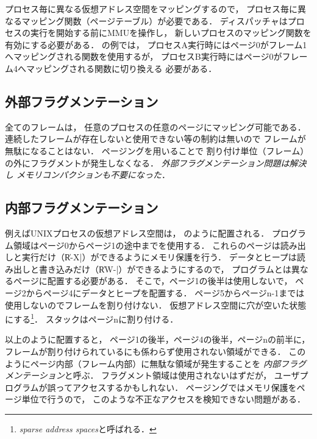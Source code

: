 プロセス毎に異なる仮想アドレス空間をマッピングするので，
プロセス毎に異なるマッピング関数（ページテーブル）が必要である．
ディスパッチャはプロセスの実行を開始する前にMMUを操作し，
新しいプロセスのマッピング関数を有効にする必要がある．
の例では，
プロセスA実行時にはページ0がフレーム1へマッピングされる関数を使用するが，
プロセスB実行時にはページ0がフレーム4へマッピングされる関数に切り換える
必要がある．

\subsection{外部フラグメンテーション}
全てのフレームは，
任意のプロセスの任意のページにマッピング可能である．
連続したフレームが存在しないと使用できない等の制約は無いので
フレームが無駄になることはない．
ページングを用いることで
割り付け単位（フレーム）の外にフラグメントが発生しなくなる．
\emph{外部フラグメンテーション問題は解決し
  メモリコンパクションも不要になった}．

\subsection{内部フラグメンテーション}
例えばUNIXプロセスの仮想アドレス空間は，
のように配置される．
プログラム領域はページ0からページ1の途中までを使用する．
これらのページは読み出しと実行だけ（\|R-X|）ができるようにメモリ保護を行う．
データとヒープは読み出しと書き込みだけ（\|RW-|）ができるようにするので，
プログラムとは異なるページに配置する必要がある．
そこで，ページ1の後半は使用しないで，
ページ2からページ4にデータとヒープを配置する．
ページ5からページn-1までは使用しないのでフレームを割り付けない．
仮想アドレス空間に穴が空いた状態にする\footnote{
  \emph{sparse address spaces}と呼ばれる．}．
スタックはページnに割り付ける．

以上のように配置すると，
ページ1の後半，ページ4の後半，ページnの前半に，
フレームが割り付けられているにも係わらず使用されない領域ができる．
このようにページ内部（フレーム内部）に無駄な領域が発生することを
\emph{内部フラグメンテーション}と呼ぶ．
フラグメント領域は使用されないはずだが，
ユーザプログラムが誤ってアクセスするかもしれない．
ページングではメモリ保護をページ単位で行うので，
このような不正なアクセスを検知できない問題がある．

